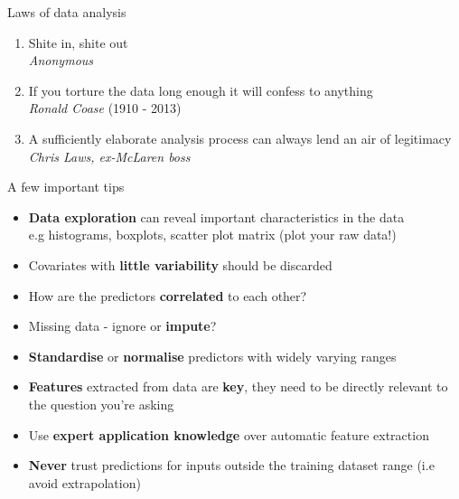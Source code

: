 \documentclass[pdf]{beamer}
\begin{document}
\begin{frame}{Laws of data analysis}
\begin{enumerate}\addtolength{\itemsep}{1.5\baselineskip}
	\item<2-> Shite in, shite out\\
			\textit{Anonymous}
	\item<3-> If you torture the data long enough it will confess to anything\\
			\textit{Ronald Coase} (1910 - 2013)
	\item<4-> A sufficiently elaborate analysis process can always lend an air of legitimacy\\ 
			\textit{Chris Laws, ex-McLaren boss} 
\end{enumerate}
\end{frame}
\begin{frame}{A few important tips}
\begin{itemize}\addtolength{\itemsep}{0.4\baselineskip}
	\item \textbf{Data exploration} can reveal important characteristics in the data\\ 
	e.g histograms, boxplots, scatter plot matrix (plot your raw data!)
	\item Covariates with \textbf{little variability} should be discarded
	\item How are the predictors \textbf{correlated} to each other? 
	\item Missing data - ignore or \textbf{impute}?
	\item \textbf{Standardise} or \textbf{normalise} predictors with widely varying ranges
	\item \textbf{Features} extracted from data are \textbf{key}, they need to be directly relevant to the question
	you're asking
	\item Use \textbf{expert application knowledge} over automatic feature extraction 
	\item \textbf{Never} trust predictions for inputs outside the training dataset range 
	(i.e avoid extrapolation)
\end{itemize}
\end{frame}
\end{document}
